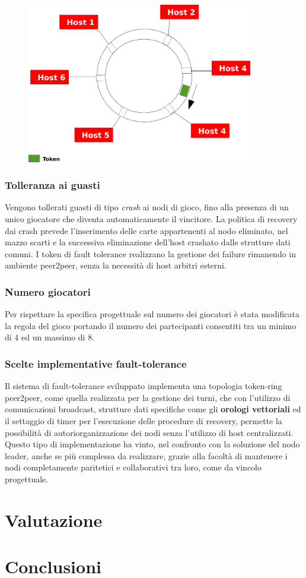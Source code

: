 \documentclass[10pt,a4paper]{article}
\begin{document}
\begin{figure}[H]
\begin{center}
\includegraphics[height=7cm, keepaspectratio]{token-ring.png}
\end{center}
\end{figure}

\subsubsection{Tolleranza ai guasti}
Vengono tollerati guasti di tipo \textit{crash} ai nodi di gioco, fino alla presenza di un unico giocatore che diventa automaticamente il vincitore. La politica di recovery dai crash prevede l'inserimento delle carte appartenenti al nodo eliminato, nel mazzo scarti e la successiva eliminazione dell'host crashato dalle strutture dati comuni. I token di fault tolerance realizzano la gestione dei failure rimanendo in ambiente peer2peer, senza la necessità di host arbitri esterni.  

\subsubsection{Numero giocatori}
Per rispettare la specifica progettuale sul numero dei giocatori è stata modificata la regola del gioco portando il numero dei partecipanti consentiti tra un minimo di 4 ed un massimo di 8. 

\subsubsection{Scelte implementative fault-tolerance}
Il sistema di fault-tolerance sviluppato implementa una topologia token-ring peer2peer, come quella realizzata per la gestione dei turni, che con  l'utilizzo di comunicazioni broadcast, strutture dati specifiche come gli \textbf{orologi vettoriali} ed il settaggio di timer per l'esecuzione delle procedure di recovery, permette la possibilità di autoriorganizzazione dei nodi senza l'utilizzo di host centralizzati. Questo tipo di implementazione ha vinto, nel confronto con la soluzione del nodo leader, anche se più complessa da realizzare, grazie alla facoltà di mantenere i nodi completamente paritetici e collaborativi tra loro, come da vincolo progettuale.

\section{Valutazione}

\section{Conclusioni}
\end{document}
